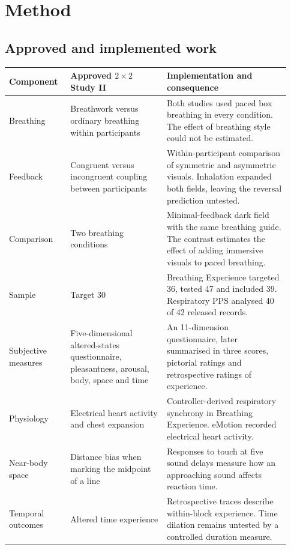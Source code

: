 \newpage
\section{Method}
\label{sec:methods}
\subsection{Approved and implemented work}
\label{sec:changes}
\small
\setlength{\tabcolsep}{4pt}
\renewcommand{\arraystretch}{1.16}
\begin{tabular}{p{0.20\linewidth}p{0.32\linewidth}p{0.41\linewidth}}
\toprule
Component & Approved $2\times2$ Study II & Implementation and consequence \\
\midrule
Breathing & Breathwork versus ordinary breathing within participants & Both studies used paced box breathing in every condition. The effect of breathing style could not be estimated. \\
Feedback & Congruent versus incongruent coupling between participants & Within-participant comparison of symmetric and asymmetric visuals. Inhalation expanded both fields, leaving the reversal prediction untested. \\
Comparison & Two breathing conditions & Minimal-feedback dark field with the same breathing guide. The contrast estimates the effect of adding immersive visuals to paced breathing. \\
Sample & Target 30 & Breathing Experience targeted 36, tested 47 and included 39. Respiratory PPS analysed 40 of 42 released records. \\
Subjective measures & Five-dimensional altered-states questionnaire, pleasantness, arousal, body, space and time & An 11-dimension questionnaire, later summarised in three scores, pictorial ratings and retrospective ratings of experience. \\
Physiology & Electrical heart activity and chest expansion & Controller-derived respiratory synchrony in Breathing Experience. eMotion recorded electrical heart activity. \\
Near-body space & Distance bias when marking the midpoint of a line & Responses to touch at five sound delays measure how an approaching sound affects reaction time. \\
Temporal outcomes & Altered time experience & Retrospective traces describe within-block experience. Time dilation remains untested by a controlled duration measure. \\
\bottomrule
\end{tabular}
\normalsize

